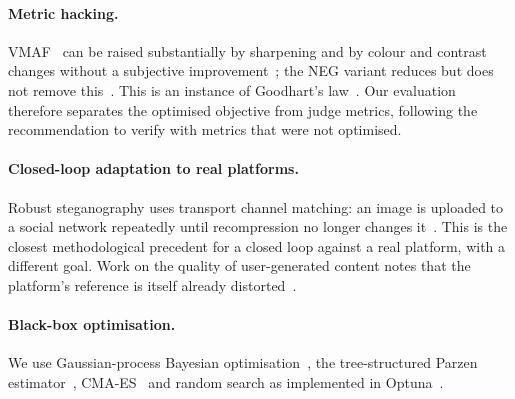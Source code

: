 \paragraph{Metric hacking.}
VMAF~\cite{li2016toward} can be raised substantially by sharpening and by colour and contrast
changes without a subjective improvement~\cite{zvezdakova2019hacking}; the NEG variant reduces but
does not remove this~\cite{siniukov2021hacking,fingscheidt2026optimizing}. This is an instance of
Goodhart's law~\cite{manheim2018categorizing}. Our evaluation therefore separates the optimised
objective from judge metrics, following the recommendation to verify with metrics that were not
optimised.

\paragraph{Closed-loop adaptation to real platforms.}
Robust steganography uses transport channel matching: an image is uploaded to a social network
repeatedly until recompression no longer changes it~\cite{zhao2019improving}. This is the closest
methodological precedent for a closed loop against a real platform, with a different goal. Work on
the quality of user-generated content notes that the platform's reference is itself already
distorted~\cite{yu2021predicting,wang2019youtube}.

\paragraph{Black-box optimisation.}
We use Gaussian-process Bayesian optimisation~\cite{snoek2012practical,shahriari2016taking}, the
tree-structured Parzen estimator~\cite{bergstra2011algorithms}, CMA-ES~\cite{hansen2001completely}
and random search as implemented in Optuna~\cite{akiba2019optuna}.

